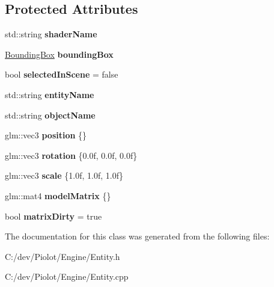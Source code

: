\subsection*{Protected Attributes}
\begin{DoxyCompactItemize}
\item 
\mbox{\label{classpiolot_1_1_entity_aa2eeb64fbf3f1445b2895ac680ba7e36}} 
std\+::string {\bfseries shader\+Name}
\item 
\mbox{\label{classpiolot_1_1_entity_a133cd55e173decca797dde8d6c4714d3}} 
\mbox{\hyperlink{classpiolot_1_1_bounding_box}{Bounding\+Box}} {\bfseries bounding\+Box}
\item 
\mbox{\label{classpiolot_1_1_entity_a50e4d7090890c7bedc3dffa1fe4d3dc9}} 
bool {\bfseries selected\+In\+Scene} = false
\item 
\mbox{\label{classpiolot_1_1_entity_acdc85c4db87446266e0e04392d54cd11}} 
std\+::string {\bfseries entity\+Name}
\item 
\mbox{\label{classpiolot_1_1_entity_a453c36793cfbab8662e28a8c10986432}} 
std\+::string {\bfseries object\+Name}
\item 
\mbox{\label{classpiolot_1_1_entity_a1996e97527821230db17bc0c93a9ba26}} 
glm\+::vec3 {\bfseries position} \{\}
\item 
\mbox{\label{classpiolot_1_1_entity_ad490e079062ae866cbd14afbc768c37f}} 
glm\+::vec3 {\bfseries rotation} \{0.\+0f, 0.\+0f, 0.\+0f\}
\item 
\mbox{\label{classpiolot_1_1_entity_a80bbefe25b4316190caf5d8cc77bd125}} 
glm\+::vec3 {\bfseries scale} \{1.\+0f, 1.\+0f, 1.\+0f\}
\item 
\mbox{\label{classpiolot_1_1_entity_abca37f3906e85c0f184f1c2ffe627a7e}} 
glm\+::mat4 {\bfseries model\+Matrix} \{\}
\item 
\mbox{\label{classpiolot_1_1_entity_ae8f4e05ad6742e55a3ed3792d21c3282}} 
bool {\bfseries matrix\+Dirty} = true
\end{DoxyCompactItemize}


The documentation for this class was generated from the following files\+:\begin{DoxyCompactItemize}
\item 
C\+:/dev/\+Piolot/\+Engine/Entity.\+h\item 
C\+:/dev/\+Piolot/\+Engine/Entity.\+cpp\end{DoxyCompactItemize}
